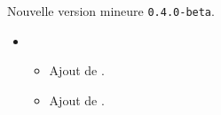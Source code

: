 Nouvelle version mineure \verb+0.4.0-beta+.

\begin{itemize}[itemsep=.5em]
    \item {}
    \begin{itemize}[itemsep=.5em]
        \item Ajout de .

        \item Ajout de .
    \end{itemize}
\end{itemize}

\separation
